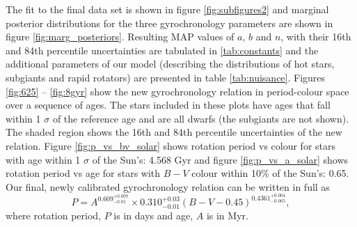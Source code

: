 \documentclass[11pt,preprint]{aastex}
\newcommand{\gyroa}{0.310}
\newcommand{\aerrp}{0.03}
\newcommand{\aerrm}{0.01}
\newcommand{\gyron}{0.609}
\newcommand{\nerrp}{0.007}
\newcommand{\nerrm}{0.01}
\newcommand{\gyrob}{0.4361}
\newcommand{\berrp}{0.004}
\newcommand{\berrm}{0.005}
\begin{document}
The fit to the final data set is shown in figure \ref{fig:subfigures2} and marginal posterior distributions for the three gyrochronology parameters are shown in figure \ref{fig:marg_posteriors}.
Resulting MAP values of $a$, $b$ and $n$, with their 16th and 84th percentile uncertainties are tabulated in \ref{tab:constants} and the additional parameters of our model (describing the distributions of hot stars, subgiants and rapid rotators) are presented in table \ref{tab:nuisance}.
Figures \ref{fig:625} -- \ref{fig:8gyr} show the new gyrochronology relation in period-colour space over a sequence of ages.
The stars included in these plots have ages that fall within 1 $\sigma$ of the reference age and are all dwarfs (the subgiants are not shown).
The shaded region shows the 16th and 84th percentile uncertainties of the new relation.
Figure \ref{fig:p_vs_bv_solar} shows rotation period vs colour for stars with age within 1 $\sigma$ of the Sun's: 4.568 Gyr and figure \ref{fig:p_vs_a_solar} shows rotation period vs age for stars with $B-V$ colour within 10\% of the Sun's: 0.65.
Our final, newly calibrated gyrochronology relation can be written in full as
\begin{equation}
	P = A^{\gyron^{+\nerrp}_{-\nerrm}} \times \gyroa^{+\aerrp}_{-\aerrm}(B-V-0.45)^{\gyrob^{+\berrp}_{-\berrm}},
\label{eq:Barnes2007_2}
\end{equation}
where rotation period, $P$ is in days and age, $A$ is in Myr.
\end{document}

